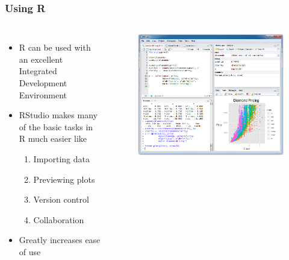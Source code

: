 \documentclass{beamer}
\begin{document}
\begin{frame}
\frametitle{Using R}
  \begin{columns}
  \begin{itemize}
  \item R can be used with an excellent Integrated Development Environment 
  \item RStudio makes many of the basic tasks in R much easier like
    \begin{enumerate}
    \item Importing data
    \item Previewing plots
    \item Version control 
    \item Collaboration
    \end{enumerate}
  \item Greatly increases ease of use
  \end{itemize}
  \begin{center}
  \begin{figure}
  \includegraphics{rstudio-windows.png}
  \end{figure}
  \end{center}
\end{columns}
\end{frame}
\end{document}
